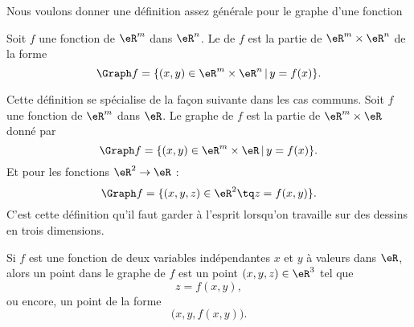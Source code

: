 
Nous voulons donner une définition assez générale pour le graphe d'une fonction
\begin{definition}
	Soit \( f\) une fonction de \( \eR^m\) dans \( \eR^n\). Le  de \( f\) est la partie de \( \eR^m\times \eR^n\) de la forme
	\begin{equation}
		\Graph f= \{ (x,y)\in \eR^m\times \eR^n \,|\, y=f(x)\}.
	\end{equation}
\end{definition}

Cette définition se spécialise de la façon suivante dans les cas communs. Soit \( f\) une fonction de \( \eR^m\) dans \( \eR\). Le graphe de \( f\) est la partie de \( \eR^m\times \eR\) donné par
\begin{equation}
	\Graph f= \{ (x,y)\in \eR^m\times \eR \,|\, y=f(x)\}.
\end{equation}
Et pour les fonctions \( \eR^2\to \eR\) :
\begin{equation}
	\Graph f= \{ (x,y,z)\in\eR^2\tq z=f(x,y) \}.
\end{equation}
C'est cette définition qu'il faut garder à l'esprit lorsqu'on travaille sur des dessins en trois dimensions.

Si \( f\) est une fonction de deux variables indépendantes \( x\) et \( y\) à valeurs dans \( \eR\), alors un point dans le graphe de \( f\) est un point \( (x,y,z)\in\eR^3\) tel que
\begin{equation}
	z=f(x,y),
\end{equation}
ou encore, un point de la forme
\begin{equation}
	\big( x,y,f(x,y) \big).
\end{equation}



